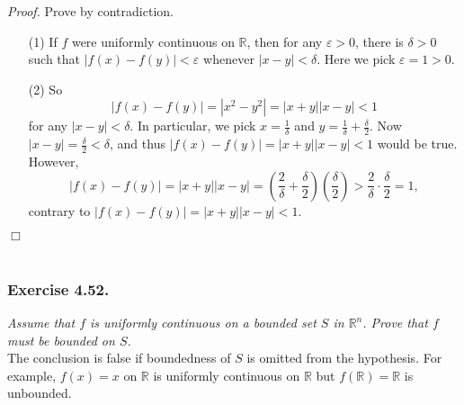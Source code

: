 \documentclass{article}
\begin{document}
\emph{Proof.}
Prove by contradiction.
\begin{enumerate}
\item[(1)]
If $f$ were uniformly continuous on $\mathbb{R}$,
then for any $\varepsilon > 0$, there is $\delta > 0$ such that
$|f(x) - f(y)| < \varepsilon$ whenever $|x - y| < \delta$.
Here we pick $\varepsilon = 1 > 0$.
\item[(2)]
So
$$|f(x) - f(y)| = |x^2 - y^2| = |x+y||x-y| < 1$$
for any $|x-y| < \delta$.
In particular, we pick $x = \frac{1}{\delta}$
and $y = \frac{1}{\delta} + \frac{\delta}{2}$.
Now $|x-y| = \frac{\delta}{2} < \delta$, and thus $|f(x) - f(y)| = |x+y||x-y| < 1$
would be true.
However,
$$|f(x) - f(y)| = |x+y||x-y|
= \left(\frac{2}{\delta}+ \frac{\delta}{2}\right)
\left(\frac{\delta}{2}\right)
> \frac{2}{\delta} \cdot \frac{\delta}{2} = 1,$$
contrary to $|f(x) - f(y)| = |x+y||x-y| < 1$.
\end{enumerate}
$\Box$ \\\\






\subsubsection*{Exercise 4.52.}
\emph{Assume that $f$ is uniformly continuous on a bounded set $S$ in $\mathbb{R}^n$.
Prove that $f$ must be bounded on $S$.} \\

The conclusion is false if boundedness of $S$ is omitted from the hypothesis.
For example, $f(x) = x$ on $\mathbb{R}$ is uniformly continuous on $\mathbb{R}$
but $f(\mathbb{R}) = \mathbb{R}$ is unbounded. \\
\end{document}
